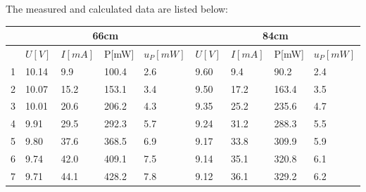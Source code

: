 \documentclass[12pt, a4paper]{article}
\begin{document}
The measured and calculated data are listed below:
\begin{table}[H]
	\begin{center}
	\begin{tabular}{|l|llll|llll|}
	\hline
	   & \multicolumn{4}{c|}{66cm}                                                                               & \multicolumn{4}{c|}{84cm}                                                                               \\ \hline
	   & \multicolumn{1}{l|}{$U[V]$} & \multicolumn{1}{l|}{$I[mA]$} & \multicolumn{1}{l|}{P{[}mW{]}} & $u_P[mW]$ & \multicolumn{1}{l|}{$U[V]$} & \multicolumn{1}{l|}{$I[mA]$} & \multicolumn{1}{l|}{P{[}mW{]}} & $u_P[mW]$ \\ \hline
	1  & \multicolumn{1}{l|}{10.14}  & \multicolumn{1}{l|}{9.9}     & \multicolumn{1}{l|}{100.4}     & 2.6       & \multicolumn{1}{l|}{9.60}   & \multicolumn{1}{l|}{9.4}     & \multicolumn{1}{l|}{90.2}      & 2.4       \\ \hline
	2  & \multicolumn{1}{l|}{10.07}  & \multicolumn{1}{l|}{15.2}    & \multicolumn{1}{l|}{153.1}     & 3.4       & \multicolumn{1}{l|}{9.50}   & \multicolumn{1}{l|}{17.2}    & \multicolumn{1}{l|}{163.4}     & 3.5       \\ \hline
	3  & \multicolumn{1}{l|}{10.01}  & \multicolumn{1}{l|}{20.6}    & \multicolumn{1}{l|}{206.2}     & 4.3       & \multicolumn{1}{l|}{9.35}   & \multicolumn{1}{l|}{25.2}    & \multicolumn{1}{l|}{235.6}     & 4.7       \\ \hline
	4  & \multicolumn{1}{l|}{9.91}   & \multicolumn{1}{l|}{29.5}    & \multicolumn{1}{l|}{292.3}     & 5.7       & \multicolumn{1}{l|}{9.24}   & \multicolumn{1}{l|}{31.2}    & \multicolumn{1}{l|}{288.3}     & 5.5       \\ \hline
	5  & \multicolumn{1}{l|}{9.80}   & \multicolumn{1}{l|}{37.6}    & \multicolumn{1}{l|}{368.5}     & 6.9       & \multicolumn{1}{l|}{9.17}   & \multicolumn{1}{l|}{33.8}    & \multicolumn{1}{l|}{309.9}     & 5.9       \\ \hline
	6  & \multicolumn{1}{l|}{9.74}   & \multicolumn{1}{l|}{42.0}    & \multicolumn{1}{l|}{409.1}     & 7.5       & \multicolumn{1}{l|}{9.14}   & \multicolumn{1}{l|}{35.1}    & \multicolumn{1}{l|}{320.8}     & 6.1       \\ \hline
	7  & \multicolumn{1}{l|}{9.71}   & \multicolumn{1}{l|}{44.1}    & \multicolumn{1}{l|}{428.2}     & 7.8       & \multicolumn{1}{l|}{9.12}   & \multicolumn{1}{l|}{36.1}    & \multicolumn{1}{l|}{329.2}     & 6.2       \\ \hline

\end{tabular}
\end{center}
\end{table}
\end{document}
